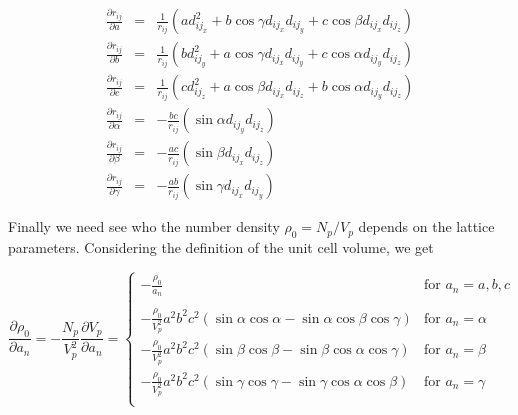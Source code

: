 \begin{eqnarray}
  \frac{\partial r_{ij}} {\partial a} & = &
    \frac{1}{r_{ij}} (a d_{ij_{x}}^{2} + b\cos\gamma d_{ij_{x}}d_{ij_{y}} +
    c \cos\beta d_{ij_{x}} d_{ij_{z}} )  \\
  \frac{\partial r_{ij}} {\partial b} & = &
    \frac{1}{r_{ij}} (b d_{ij_{y}}^{2} + a\cos\gamma d_{ij_{x}}d_{ij_{y}} +
    c \cos\alpha d_{ij_{y}} d_{ij_{z}} )  \\
  \frac{\partial r_{ij}} {\partial c} & = &
    \frac{1}{r_{ij}} (c d_{ij_{z}}^{2} + a\cos\beta d_{ij_{x}}d_{ij_{z}} +
    b \cos\alpha d_{ij_{y}} d_{ij_{z}} )  \\
  \frac{\partial r_{ij}} {\partial \alpha} & = &
    - \frac{bc}{r_{ij}} (\sin\alpha d_{ij_{y}} d_{ij_{z}} ) \\
  \frac{\partial r_{ij}} {\partial \beta}  & = &
    - \frac{ac}{r_{ij}} (\sin\beta  d_{ij_{x}} d_{ij_{z}} ) \\
  \frac{\partial r_{ij}} {\partial \gamma} & = &
    - \frac{ab}{r_{ij}} (\sin\gamma d_{ij_{x}} d_{ij_{y}} )
  \label{eq_d/da4}
\end{eqnarray}

Finally we need see who the number density $\rho_{0} = N_{p}/V_{p}$ depends
on the lattice parameters. Considering the definition of the unit cell
volume, we get

\begin{equation}
  \frac{\partial \rho_{0}} {\partial a_{n}} =
    - \frac{N_{p}}{V_{p}^{2}} \frac {\partial V_{p}} {\partial a_{n}} =
    \left \{ \begin{array}{ll}
             - \frac{\rho_{0}}{a_{n}} & \mbox{for $a_{n}=a,b,c$} \\ & \\
             - \frac{\rho_{0}}{V_{p}^{2}}a^{2}b^{2}c^{2}
               (\sin\alpha\cos\alpha - \sin\alpha\cos\beta\cos\gamma)
                                          & \mbox{for $a_{n}=\alpha$} \\
             - \frac{\rho_{0}}{V_{p}^{2}}a^{2}b^{2}c^{2}
               (\sin\beta\cos\beta   - \sin\beta\cos\alpha\cos\gamma)
                                          & \mbox{for $a_{n}=\beta$} \\
             - \frac{\rho_{0}}{V_{p}^{2}}a^{2}b^{2}c^{2}
               (\sin\gamma\cos\gamma - \sin\gamma\cos\alpha\cos\beta)
                                          & \mbox{for $a_{n}=\gamma$} \\
             \end{array}\right.
   \label{eq_d/da5}
\end{equation}

